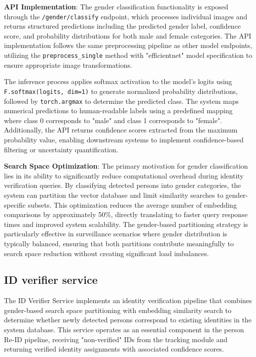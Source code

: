 \textbf{API Implementation}: The gender classification functionality is exposed through the \texttt{/gender/classify} endpoint, which processes individual images and returns structured predictions including the predicted gender label, confidence score, and probability distributions for both male and female categories. The API implementation follows the same preprocessing pipeline as other model endpoints, utilizing the \texttt{preprocess\_single} method with "efficientnet" model specification to ensure appropriate image transformations.

The inference process applies softmax activation to the model's logits using \texttt{F.softmax(logits, dim=1)} to generate normalized probability distributions, followed by \texttt{torch.argmax} to determine the predicted class. The system maps numerical predictions to human-readable labels using a predefined mapping where class 0 corresponds to "male" and class 1 corresponds to "female". Additionally, the API returns confidence scores extracted from the maximum probability value, enabling downstream systems to implement confidence-based filtering or uncertainty quantification.

\textbf{Search Space Optimization}: The primary motivation for gender classification lies in its ability to significantly reduce computational overhead during identity verification queries. By classifying detected persons into gender categories, the system can partition the vector database and limit similarity searches to gender-specific subsets. This optimization reduces the average number of embedding comparisons by approximately 50\%, directly translating to faster query response times and improved system scalability. The gender-based partitioning strategy is particularly effective in surveillance scenarios where gender distribution is typically balanced, ensuring that both partitions contribute meaningfully to search space reduction without creating significant load imbalances.

\subsection{ID verifier service}
\label{sec:id_verifier_service}
The ID Verifier Service implements an identity verification pipeline that combines gender-based search space partitioning with embedding similarity search to determine whether newly detected persons correspond to existing identities in the system database. This service operates as an essential component in the person Re-ID pipeline, receiving "non-verified" IDs from the tracking module and returning verified identity assignments with associated confidence scores.

